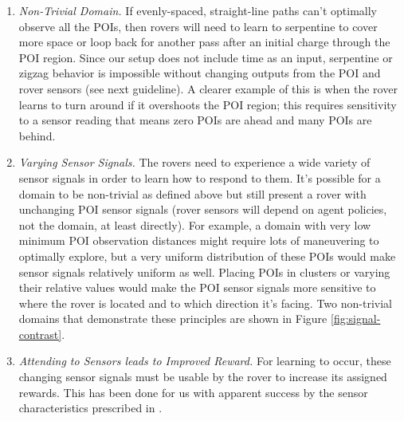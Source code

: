 \documentclass[letterpaper, 10 pt, conference]{ieeeconf}  %
\begin{document}
\begin{enumerate}
\item \emph{Non-Trivial Domain.} If evenly-spaced, straight-line paths can't optimally observe all the POIs, then rovers will need to learn to serpentine to cover more space or loop back for another pass after an initial charge through the POI region. Since our setup does not include time as an input, serpentine or zigzag behavior is impossible without changing outputs from the POI and rover sensors (see next guideline). A clearer example of this is when the rover learns to turn around if it overshoots the POI region; this requires sensitivity to a sensor reading that means zero POIs are ahead and many POIs are behind. 

\item \emph{Varying Sensor Signals.} The rovers need to experience a wide variety of sensor signals in order to learn how to respond to them. It's possible for a domain to be non-trivial as defined above but still present a rover with unchanging POI sensor signals (rover sensors will depend on agent policies, not the domain, at least directly). For example, a domain with very low minimum POI observation distances might require lots of maneuvering to optimally explore, but a very uniform distribution of these POIs would make sensor signals relatively uniform as well. Placing POIs in clusters or varying their relative values would make the POI sensor signals more sensitive to where the rover is located and to which direction it's facing. Two non-trivial domains that demonstrate these principles are shown in Figure \ref{fig:signal-contrast}.

\item \emph{Attending to Sensors leads to Improved Reward.} For learning to occur, these changing sensor signals must be usable by the rover to increase its assigned rewards. This has been done for us with apparent success by the sensor characteristics prescribed in \cite{agogino2008analyzing}.


\end{enumerate}
\end{document}
